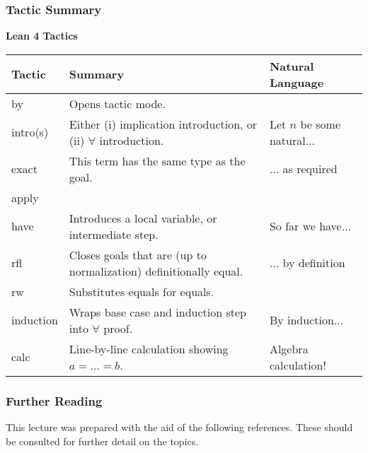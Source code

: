 \documentclass{beamer}
\theoremstyle{indentDefn} \newtheorem{defn}[]{Definition}
\begin{document}
\begin{frame}
	\frametitle{Tactic Summary}
	
	\begin{table}[htbp]
    \centering
    \renewcommand{\arraystretch}{1.5}
    \textbf{Lean 4 Tactics}\\
    \vspace{0.2cm}        
    \footnotesize
    \begin{tabular}{|l|l|l|}
    \hline
    \textbf{Tactic} & \textbf{Summary} & \textbf{Natural Language} \\
    \hline
    by & Opens tactic mode. & \\
    intro(s) & Either (i) implication introduction, or (ii) $\forall$ introduction. & Let $n$ be some natural...\\
    exact & This term has the same type as the goal. & ... as required \\
    apply & & \\
    have & Introduces a local variable, or intermediate step. & So far we have... \\
    rfl & Closes goals that are (up to normalization) definitionally equal. & ... by definition \\
    rw & Substitutes equals for equals. & \\
    induction & Wraps base case and induction step into $\forall$ proof. & By induction...\\
    calc & Line-by-line calculation showing $a = \dots = b$. & Algebra calculation!\\
    \hline
    \end{tabular}
\end{table}

\end{frame}


\begin{frame}
	\frametitle{Further Reading}
	
    This lecture was prepared with the aid of the following references. 
    These should be consulted for further detail on the topics. 

    \printbibliography
	
\end{frame}
\end{document}
